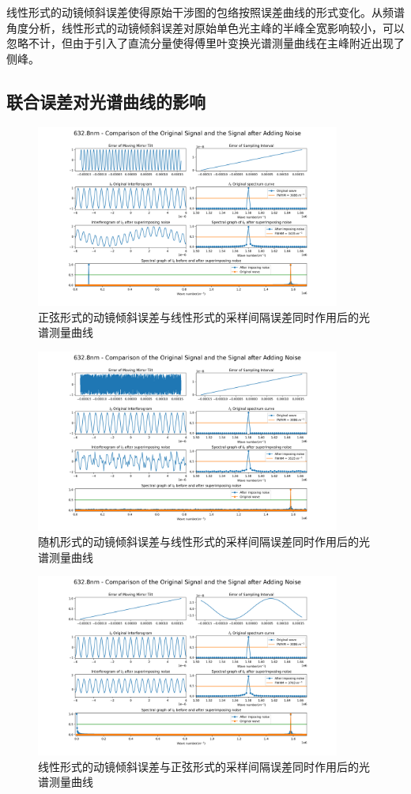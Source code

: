 \documentclass[conference]{IEEEtran}
\begin{document}
线性形式的动镜倾斜误差使得原始干涉图的包络按照误差曲线的形式变化。从频谱角度分析，线性形式的动镜倾斜误差对原始单色光主峰的半峰全宽影响较小，可以忽略不计，但由于引入了直流分量使得傅里叶变换光谱测量曲线在主峰附近出现了侧峰。

\subsection{联合误差对光谱曲线的影响}
\begin{figure}[htbp]
	\centerline{
		\includegraphics[width=10cm]{4.png} 	
	}
	\caption{正弦形式的动镜倾斜误差与线性形式的采样间隔误差同时作用后的光谱测量曲线}
	\label{pic4}
\end{figure}

\begin{figure}[htbp]
	\centerline{
		\includegraphics[width=10cm]{5.png} 	
	}
	\caption{随机形式的动镜倾斜误差与线性形式的采样间隔误差同时作用后的光谱测量曲线}
	\label{pic5}
\end{figure}

\begin{figure}[htbp]
	\centerline{
		\includegraphics[width=10cm]{6.png} 	
	}
	\caption{线性形式的动镜倾斜误差与正弦形式的采样间隔误差同时作用后的光谱测量曲线}
	\label{pic6}
\end{figure}
\end{document}
